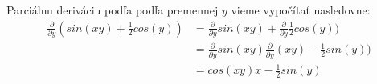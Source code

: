\documentclass[../main.tex]{subfiles}
\begin{document}
Parciálnu deriváciu podľa podľa premennej $y$ vieme vypočítať nasledovne:
\begin{equation}
	\begin{aligned}
	\frac{\partial}{\partial y}(sin(xy)+\frac{1}{2}cos(y)) &= \frac{\partial}{\partial y}sin(xy)+\frac{\partial}{\partial y}\frac{1}{2}cos(y)) \\
	&= \frac{\partial}{\partial y}sin(xy)\frac{\partial}{\partial y}(xy)-\frac{1}{2}sin(y)) \\
	&= cos(xy)x - \frac{1}{2}sin(y) \\
	\end{aligned}
	\label{eqn:PDy2}
\end{equation}
		
\end{document}
